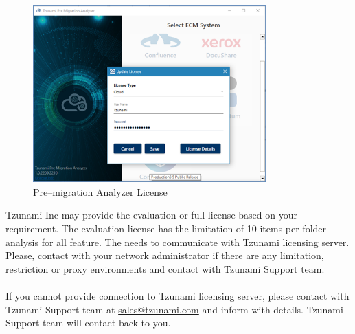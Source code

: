\begin{figure} 
  \centering
	\includegraphics[width=0.8\textwidth]{Images/SelectEcmImage.png}
 \caption{Pre--migration Analyzer License}
\end{figure}
Tzunami Inc may provide the evaluation or full license based on your requirement. The evaluation license has the limitation of 10 items per folder analysis for all feature.
The \appName needs to communicate with Tzunami licensing server. Please, contact with your network administrator if there are any limitation, restriction or proxy environments and contact with Tzunami Support team. \\\\
If you cannot provide connection to Tzunami licensing server, please contact with Tzunami Support team at \href{mailto: sales@tzunami.com}{sales@tzunami.com} and inform with details. Tzunami Support team will contact back to you.
